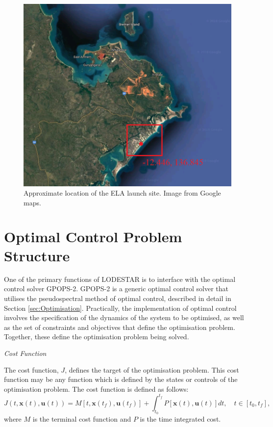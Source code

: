 \begin{figure}[ht]
\centering
\includegraphics[width=0.7\linewidth]{figures/4_LODESTAR/SiteLocation}
\caption{Approximate location of the ELA launch site. Image from Google maps.}
\label{fig:SiteLocation}
\end{figure}


\section{Optimal Control Problem Structure}

One of the primary functions of LODESTAR is to interface with the optimal control solver GPOPS-2. GPOPS-2 is a generic optimal control solver that utilises the pseudospectral method of optimal control, described in detail in Section \ref{sec:Optimisation}. Practically, the implementation of optimal control involves the specification of the dynamics of the system to be optimised, as well as the set of constraints and objectives that define the optimisation problem. 
 Together, these define the optimisation problem being solved.

\noindent \textit{Cost Function}

\noindent The cost function, $J$, defines the target of the optimisation problem. 
This cost function may be any function which is defined by the states or controls of the optimisation problem. The cost function is defined as follows:
\begin{equation} \label{eq:cost}
J(t,\textbf{x}(t),\textbf{u}(t)) = M[t,\textbf{x}(t_f),\textbf{u}(t_f)] +   \int_{t_0}^{t_f} P[\textbf{x}(t),\textbf{u}(t)] dt, \quad t \in [t_0,t_f],
\end{equation}
where $M$ is the terminal cost function and $P$ is the time integrated cost. 

